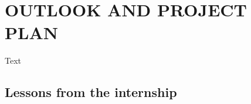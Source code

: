 \chapter[CHAPTER 3]{OUTLOOK AND PROJECT PLAN}\label{ch:3}
\pagestyle{plain}
\vspace{-6mm} 

Text

\vspace{3.25ex} %
\section{Lessons from the internship}
\vspace{-8mm}


\vspace{-8mm}